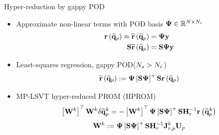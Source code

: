 \documentclass[]{beamer}
\begin{document}
\begin{frame}{Hyper-reduction by gappy POD}
    \begin{itemize}
		\item Approximate non-linear terms with POD basis $\deimBasis \in \mathbb{R}^{\numDOF \times \numResModes}$
		\begin{align*}
			\resFunc{\primVecCoef} \approx \resApproxFunc{\primVecCoef} &= \deimBasis \dummyVec \\
			\sampMat \resApproxFunc{\primVecCoef} &= \sampMat \deimBasis \dummyVec
		\end{align*}
		\item Least-squares regression, gappy POD\footnotemark[8] ($N_s > N_r$)
		\begin{equation*}
			\resApproxFunc{\primVecCoef} \defEq \deimBasis \left[ \sampMat \deimBasis \right]^{+} \sampMat \resFunc{\primVecCoef}
		\end{equation*}
		\item MP-LSVT hyper-reduced PROM (HPROM)
		\begin{equation*}
			\left[ \testBasis^\newtonIdx \right]^\top \testBasis^\newtonIdx \delta \primVecCoef^{\newtonIdx} = -\left[\testBasis^\newtonIdx \right]^\top \deimBasis \left[ \sampMat \deimBasis \right]^{+} \sampMat \resScaleInv \resFunc{\primVecCoef^{\newtonIdx}}
		\end{equation*}
		\begin{equation*}
			\testBasis^\newtonIdx \defEq \deimBasis \left[ \sampMat \deimBasis \right]^{+} \sampMat \resScaleInv \jacobResPrim^{\newtonIdx} \primTrial
		\end{equation*}
	\end{itemize}
\end{frame}
\end{document}
